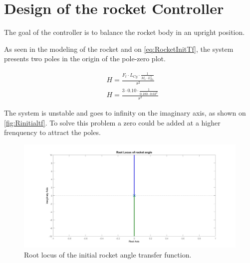 \graphicspath{{figures/Design/IPController/}}

\chapter{Design of the rocket Controller}\label{sec:IPController}
The goal of the controller is to balance the rocket body in an upright position. 

As seen in the modeling of the rocket and on \autoref{eq:RocketInitTf}, the system presents two poles in the origin of the pole-zero plot. 

\begin{subequations}
	\begin{flalign}
		& H = \frac{F_t \cdot L_{Cg} \cdot \frac{1}{M_r \cdot L_{Es}^2}}{s^2}	\label{eq:RocketInitTf} \\
		& H = \frac{3 \cdot 0.10 \cdot \frac{1}{0.180 \cdot 0.03^2}}{s^2}
	\end{flalign}
\end{subequations}
\startexplain
{}
\stopexplain

The system is unstable and goes to infinity on the imaginary axis, as shown on \autoref{fig:Rinitialtf}. To solve this problem a zero could be added at a higher frenquency to attract the poles.

\begin{figure}[htbp]
	\centering
	
		\includegraphics[width=\textwidth]{figures/Rocket/design/initial_transfer_function_vf}
		\caption{Root locus of the initial rocket angle transfer function.}
		\label{fig:Rinitialtf}
	
\end{figure}

